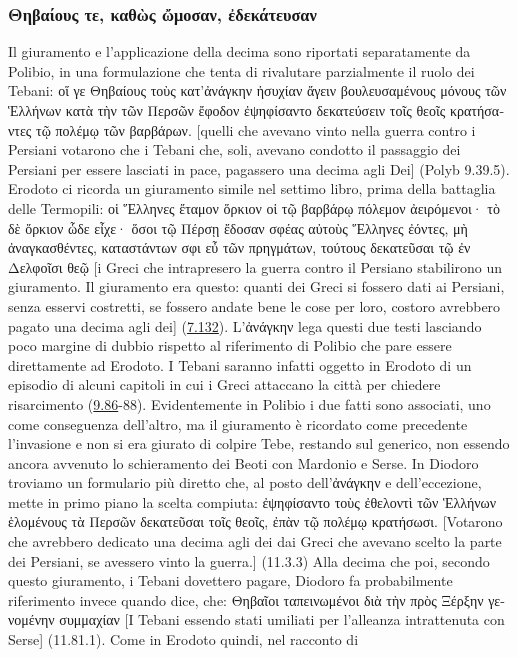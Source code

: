 {    \subsubsection{\textgreek{Θηβαίους τε, καθὼς ὤμοσαν, ἐδεκάτευσαν}}
    Il giuramento e l'applicazione della decima sono riportati separatamente da Polibio, in una formulazione che tenta di rivalutare parzialmente il ruolo dei Tebani: \textgreek{οἵ γε Θηβαίους τοὺς κατ’ἀνάγκην ἡσυχίαν ἄγειν βουλευσαμένους μόνους τῶν Ἑλλήνων κατὰ τὴν τῶν Περσῶν ἔφοδον ἐψηφίσαντο δεκατεύσειν τοῖς θεοῖς κρατήσαντες τῷ πολέμῳ τῶν βαρβάρων.} [quelli che avevano vinto nella guerra contro i Persiani votarono che i Tebani che, soli, avevano condotto il passaggio dei Persiani per essere lasciati in pace, pagassero una decima agli Dei] (Polyb 9.39.5). Erodoto ci ricorda un giuramento simile nel settimo libro, prima della battaglia delle Termopili: \textgreek{οἱ Ἕλληνες ἔταμον ὅρκιον οἱ τῷ βαρβάρῳ πόλεμον ἀειρόμενοι· τὸ δὲ ὅρκιον ὧδε εἶχε· ὅσοι τῷ Πέρσῃ ἔδοσαν σφέας αὐτοὺς Ἕλληνες ἐόντες, μὴ ἀναγκασθέντες, καταστάντων σφι εὖ τῶν πρηγμάτων, τούτους δεκατεῦσαι τῷ ἐν Δελφοῖσι θεῷ} [i Greci che intrapresero la guerra contro il Persiano stabilirono un giuramento. Il giuramento era questo: quanti dei Greci si fossero dati ai Persiani, senza esservi costretti, se fossero andate bene le cose per loro, costoro avrebbero pagato una decima agli dei] (\href{http://data.perseus.org/citations/urn:cts:greekLit:tlg0016.tlg001.perseus-grc1:7.132}{7.132}). L'\textgreek{ἀνάγκην} lega questi due testi lasciando poco margine di dubbio rispetto al riferimento di Polibio  che pare essere direttamente ad Erodoto. I Tebani saranno infatti oggetto in Erodoto di un episodio di alcuni capitoli in cui i Greci attaccano la città per chiedere risarcimento (\href{http://data.perseus.org/citations/urn:cts:greekLit:tlg0016.tlg001.perseus-grc1:9.86}{9.86}-88).  Evidentemente in Polibio i due fatti sono associati, uno come conseguenza dell'altro, ma il giuramento è ricordato come precedente l'invasione e non si era giurato di colpire Tebe, restando sul generico, non essendo ancora avvenuto lo schieramento dei Beoti con Mardonio e Serse. In  Diodoro troviamo un formulario più diretto che, al posto dell'\textgreek{ἀνάγκην} e dell'eccezione, mette in primo piano la scelta compiuta: \textgreek{ἐψηφίσαντο τοὺς ἐθελοντὶ τῶν Ἑλλήνων ἑλομένους τὰ Περσῶν δεκατεῦσαι τοῖς θεοῖς, ἐπὰν τῷ πολέμῳ κρατήσωσι.} [Votarono che avrebbero dedicato una decima agli dei dai Greci che avevano scelto la parte dei Persiani, se avessero vinto la guerra.] (11.3.3) Alla decima che poi, secondo questo giuramento, i Tebani dovettero pagare,  Diodoro fa probabilmente riferimento invece quando dice, che: \textgreek{Θηβαῖοι ταπεινωμένοι διὰ τὴν πρὸς Ξέρξην γενομένην συμμαχίαν} [I Tebani essendo stati umiliati per l'alleanza intrattenuta con Serse] (11.81.1). Come in Erodoto quindi, nel racconto di  }
